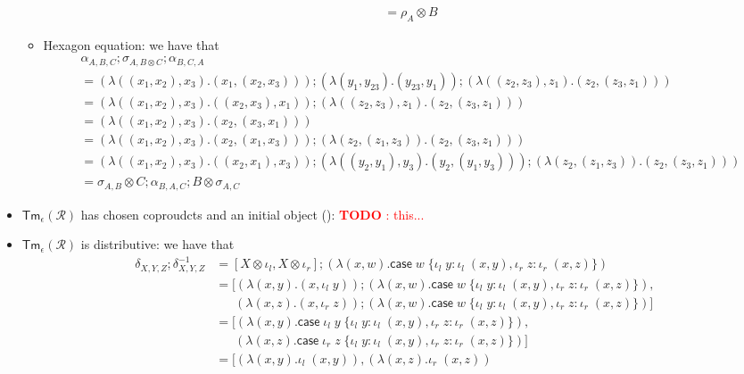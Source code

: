 \documentclass[acmsmall,screen,review]{acmart}
\newcounter{todos}
\newcommand{\todo}[1]{\stepcounter{todos} \textcolor{red}{\textbf{TODO \arabic{todos}}: #1}}
\newcommand{\mc}[1]{\ensuremath{\mathcal{#1}}}
\newcommand{\ms}[1]{\ensuremath{\mathsf{#1}}}
\newcommand{\lto}{:}
\newcommand{\linl}[1]{\iota_l\;{#1}}
\newcommand{\linr}[1]{\iota_r\;{#1}}
\newcommand{\caseexpr}[5]{\ms{case}\;#1\;\{\linl{#2} \lto #3, \linr{#4} \lto #5\}}
\newcommand{\cmark}{\ding{51}}%
\begin{document}
\begin{itemize}
\begin{itemize}
\begin{align*}
      &= \rho_A \otimes B
    \end{align*}
    \item Hexagon equation: we have that
    \begin{align*}
      &\alpha_{A, B, C} ; \sigma_{A, B \otimes C} ; \alpha_{B, C, A} \\
      &= (\lambda ((x_1, x_2), x_3) . (x_1, (x_2, x_3))) 
        ; (\lambda (y_1, y_{23}) . (y_{23}, y_1))
        ; (\lambda ((z_2, z_3), z_1) . (z_2, (z_3, z_1)))
      \\
      &= (\lambda ((x_1, x_2), x_3) . ((x_2, x_3), x_1)) 
        ;  (\lambda ((z_2, z_3), z_1) . (z_2, (z_3, z_1))) 
      \\
      &= (\lambda ((x_1, x_2), x_3) . (x_2, (x_3, x_1))) \\
      &= (\lambda ((x_1, x_2), x_3) . (x_2, (x_1, x_3)))
        ; (\lambda (z_2, (z_1, z_3)) . (z_2, (z_3, z_1)))
      \\
      &= (\lambda ((x_1, x_2), x_3) . ((x_2, x_1), x_3)) 
        ; (\lambda ((y_2, y_1), y_3) . (y_2, (y_1, y_3)))
        ; (\lambda (z_2, (z_1, z_3)) . (z_2, (z_3, z_1)))
      \\
      &= \sigma_{A, B} \otimes C ; \alpha_{B, A, C} ; B \otimes \sigma_{A, C}
    \end{align*}
  \end{itemize}
  \item $\ms{Tm}_\epsilon(\mc{R})$ has chosen coproudcts and an initial object (\cmark):
  \todo{this...}
  \item $\ms{Tm}_\epsilon(\mc{R})$ is distributive: we have that
  \begin{align*}
    \delta_{X, Y, Z} ; \delta^{-1}_{X, Y, Z}
    &= [X \otimes \iota_l, X \otimes \iota_r] ; (\lambda (x, w) . 
      \caseexpr{w}{y}{\linl{(x, y)}}{z}{\linr{(x, z)}}) \\
    &= [
      (\lambda (x, y) . (x, \linl{y})) 
      ; (\lambda (x, w) . \caseexpr{w}{y}{\linl{(x, y)}}{z}{\linr{(x, z)}}), \\ & \quad\;\;
      (\lambda (x, z) . (x, \linr{z})) 
      ; (\lambda (x, w) . \caseexpr{w}{y}{\linl{(x, y)}}{z}{\linr{(x, z)}})
    ] \\
    &= [
      (\lambda (x, y) . \caseexpr{\linl{y}}{y}{\linl{(x, y)}}{z}{\linr{(x, z)}}), \\ & \quad\;\;
      (\lambda (x, z) . \caseexpr{\linr{z}}{y}{\linl{(x, y)}}{z}{\linr{(x, z)}})
    ] \\
    &= [
      (\lambda (x, y) . \linl{(x, y)}),
      (\lambda (x, z) . \linr{(x, z)})

\end{align*}
\end{itemize}
\end{document}
